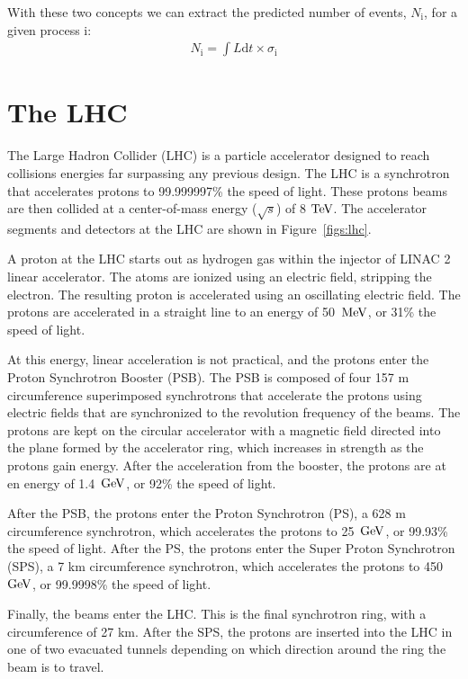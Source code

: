 With these two concepts we can extract the predicted number of events, $N_{\mathrm{i}}$, for a given process i: 
\begin{eqnarray}
N_{\mathrm{i}} = \int L \mathrm{d}t \times \sigma_{\mathrm{i}} 
\label{eqn:Nevents}
\end{eqnarray}  

\section{The LHC}
The Large Hadron Collider (LHC) is a particle accelerator designed to reach collisions energies far surpassing any previous design.  
The LHC is a synchrotron that accelerates protons to 99.999997\% the speed of light.  
These protons beams are then collided at a center-of-mass energy ($\sqrt{s}$) of 8 $\mathrm{TeV}$.  
The accelerator segments and detectors at the LHC are shown in Figure~\ref{figs:lhc}.


A proton at the LHC starts out as hydrogen gas within the injector of LINAC 2 linear accelerator.  
The atoms are ionized using an electric field, stripping the electron.  
The resulting proton is accelerated using an oscillating electric field.  
The protons are accelerated in a straight line to an energy of 50~$\mathrm{MeV}$, or 31\% the speed of light.  

At this energy, linear acceleration is not practical, and the protons enter the Proton Synchrotron Booster (PSB).  The PSB is composed of four 157 m 
circumference superimposed synchrotrons that accelerate the protons using electric fields that are synchronized to the revolution frequency of the beams.  
The protons are kept on the circular accelerator with a magnetic field directed into the plane formed by the accelerator ring, which increases in strength as the protons gain energy.  
After the acceleration from the booster, the protons are at en energy of 1.4~$\mathrm{GeV}$, or 92\% the speed of light.

After the PSB, the protons enter the Proton Synchrotron (PS), a 628 m circumference synchrotron, which accelerates the protons to 25~$\mathrm{GeV}$, or 99.93\% the speed of light.  
After the PS, the protons enter the Super Proton Synchrotron (SPS), a 7 km circumference synchrotron, which accelerates the protons to 450~$\mathrm{GeV}$, or 99.9998\% the speed of light.

Finally, the beams enter the LHC.  This is the final synchrotron ring, with a circumference of 27 km.  
After the SPS, the protons are inserted into the LHC in one of two evacuated tunnels depending on which direction around the ring the beam is to travel.  


